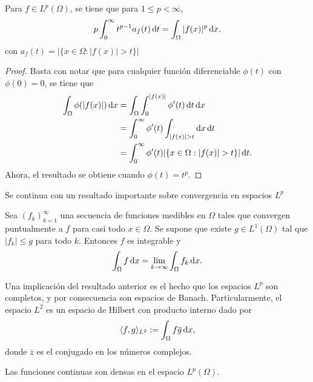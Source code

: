 \begin{proposition}
	Para $f\in L^p(\Omega)$, se tiene que para $1\leq p<\infty$,
	\begin{equation*}
		p\int_0^\infty t^{p-1} a_f(t) \mathop{}\!\mathrm{d} t = \int_\Omega |f(x)|^p \mathop{}\!\mathrm{d} x.
	\end{equation*}
	con $a_f(t) = |\{x\in\Omega: |f(x)|>t\}| $
\end{proposition}
\begin{proof}
	Basta con notar que para cualquier función diferenciable $\phi(t)$ con $\phi(0)=0$, se tiene que
	\begin{align*}
		\int_\Omega \phi(|f(x)|) \diff x & = \int_\Omega \int_0^{|f(x)|} \phi'(t) \diff t \diff x \\
		& = \int_0^\infty \phi'(t) \int_{|f(x)|>t}  \diff x \diff t \\
		& = \int_0^\infty \phi'(t) |\{x\in\Omega: |f(x)|>t\}| \diff t.
	\end{align*}
	Ahora, el resultado se obtiene cuando $\phi(t) = t^p$.
\end{proof}
Se continua con un resultado importante sobre convergencia en 
espacios $L^p$
\begin{theorem}
    Sea $(f_k)_{k=1}^\infty$ una secuencia de funciones medibles en $\Omega$ 
    tales que convergen puntualmente a $f$ para casi todo $x\in\Omega$. Se supone
    que existe $g\in L^1(\Omega)$ tal que $|f_k|\leq g$ para todo $k$. Entonces
    $f$ es integrable y 
    \begin{equation*}
        \int_\Omega f \mathop{}\!\mathrm{d} x = \lim_{k\rightarrow\infty} \int_\Omega 
        f_k \mathop{}\!\mathrm{d} x.
    \end{equation*}
\end{theorem}
\begin{remark}
    Una implicación del resultado anterior es el hecho que los espacios $L^p$ son 
    completos, y por consecuencia son espacios de Banach. Particularmente, el 
    espacio $L^2$ es un espacio de Hilbert con producto interno dado por
    \begin{equation*}
        \langle f, g\rangle_{L^2} := \int_\Omega f\overline{g}\mathop{}\!\mathrm{d} x,
    \end{equation*}
    donde $\overline{z}$ es el conjugado en los números complejos.
\end{remark}
\begin{theorem}
	Las funciones continuas son densas en el espacio $L^p(\Omega)$.
\end{theorem}

